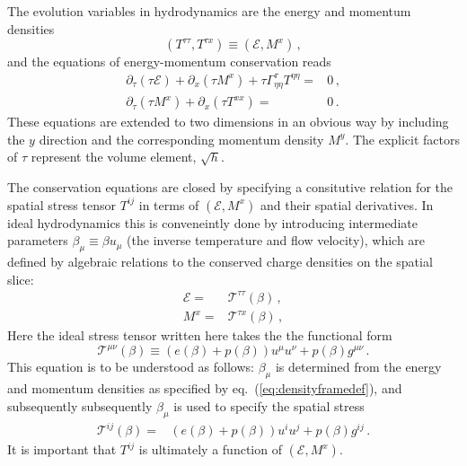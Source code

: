 \documentclass[12pt,aps,preprint,nofootinbib,noshowkeys,noshowpacs,longbibliography,superscriptaddress,tightenlines]{revtex4-2}
\def\edense{{\mathcal{E}}}
\def\pdense{M}
\def\Eq#1{eq.~(\ref{#1})}
\def\st{\begin{equation}}
\def\stp{\end{equation}}
\def\tideal{{\mathcal T}}
\begin{document}
The evolution variables in hydrodynamics are the energy and momentum densities 
\st
( T^{\tau\tau},  T^{\tau x} ) \equiv (\edense , \pdense^x)\,,
\stp
and the equations of energy-momentum conservation reads
  \begin{subequations}
  \begin{align}
  \partial_\tau (\tau \edense) + \partial_x  (\tau \pdense^x)  + \tau \Gamma^{\tau}_{\eta\eta} T^{\eta\eta}=&  0 \, , 
   \label{eq:equation}   \\
  \partial_\tau  (\tau \pdense^x) + \partial_x (\tau T^{xx}) =&0 \,.  
  \label{eq:pequation}
\end{align} 
  \end{subequations}
These equations are extended to two dimensions in an obvious way by including the $y$ direction and the corresponding momentum density $\pdense^y$. The explicit factors of $\tau$ represent the volume element, $\sqrt{h}$. 


The conservation equations are closed by specifying a
consitutive relation for the spatial stress tensor $T^{ij}$ in terms of
$(\edense, \pdense^x)$ and their spatial derivatives.
In ideal hydrodynamics this is  conveneintly done by introducing intermediate parameters $\beta_{\mu}\equiv \beta u_{\mu}$ (the inverse temperature and flow velocity), which are defined by algebraic relations to the  conserved charge densities on the spatial slice:
\begin{subequations}
  \label{eq:densityframedef}
\begin{align}
  \edense =& \tideal^{\tau\tau}(\beta) \, , \\
  \pdense^x =& \tideal^{\tau x}(\beta)  \,  , 
\end{align}
\end{subequations}
Here the ideal stress tensor written here takes the  
the functional form
\st
\tideal^{\mu\nu}(\beta) \equiv \left(e(\beta) + p(\beta)\right)  u^{\mu} u^{\nu} + p(\beta) g^{\mu\nu} \, . 
\stp
This equation  is to be understood as follows: $\beta_{\mu}$ is determined from the energy and momentum densities as specified by \Eq{eq:densityframedef},  and subsequently 
subsequently $\beta_{\mu}$ is used to specify the spatial stress 
\begin{align}
   \tideal^{ij}(\beta) =& \left(e(\beta) + p(\beta)\right)  u^{i} u^{j} + p(\beta) g^{ij} \, .
\end{align}
It is important that $T^{ij}$ is ultimately a function of $(\edense, \pdense^x)$.
\end{document}

